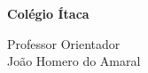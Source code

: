 \begin{titlepage}
\begin{center}
\vspace*{3\baselineskip}
\textbf{Colégio Ítaca}

\vspace{4\baselineskip}

\textbf{\theauthor}

\vspace{10\baselineskip}

\thetitle

\vspace{5\baselineskip}
\end{center}

\begin{flushright}

{\small
Professor Orientador\\João Homero do Amaral}
\normalsize

\vspace{4\baselineskip}

\end{flushright}

\begin{centering}

\onehalfspacing
\normalsize
\thedate

\end{centering}
\end{titlepage}

